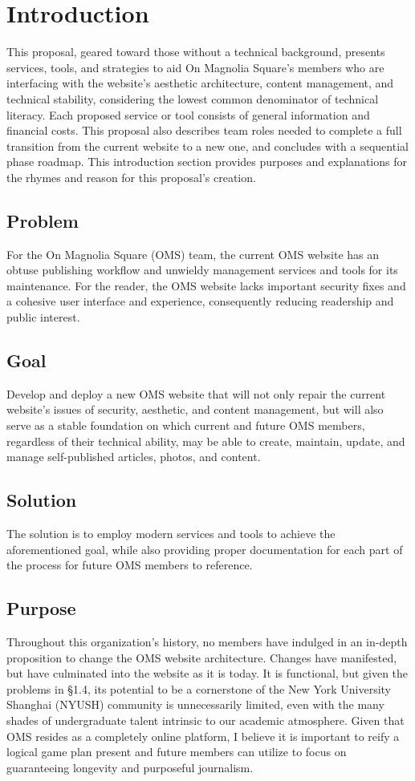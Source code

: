 \section{Introduction}
This proposal, geared toward those without a technical background, presents services, tools, and strategies to aid On Magnolia Square's members who are interfacing with the website's aesthetic architecture, content management, and technical stability, considering the lowest common denominator of technical literacy. Each proposed service or tool consists of general information and financial costs. This proposal also describes team roles needed to complete a full transition from the current website to a new one, and concludes with a sequential phase roadmap. This introduction section provides purposes and explanations for the rhymes and reason for this proposal's creation.

\subsection{Problem}
For the On Magnolia Square (OMS) team, the current OMS website has an obtuse publishing workflow and unwieldy management services and tools for its maintenance. For the reader, the OMS website lacks important security fixes and a cohesive user interface and experience, consequently reducing readership and public interest.

\subsection{Goal}
Develop and deploy a new OMS website that will not only repair the current website's issues of security, aesthetic, and content management, but will also serve as a stable foundation on which current and future OMS members, regardless of their technical ability, may be able to create, maintain, update, and manage self-published articles, photos, and content.

\subsection{Solution}
The solution is to employ modern services and tools to achieve the aforementioned goal, while also providing proper documentation for each part of the process for future OMS members to reference.

\subsection{Purpose}
Throughout this organization's history, no members have indulged in an in-depth proposition to change the OMS website architecture. Changes have manifested, but have culminated into the website as it is today. It is functional, but given the problems in §1.4, its potential to be a cornerstone of the New York University Shanghai (NYUSH) community is unnecessarily limited, even with the many shades of undergraduate talent intrinsic to our academic atmosphere. Given that OMS resides as a completely online platform, I believe it is important to reify a logical game plan present and future members can utilize to focus on guaranteeing longevity and purposeful journalism.


